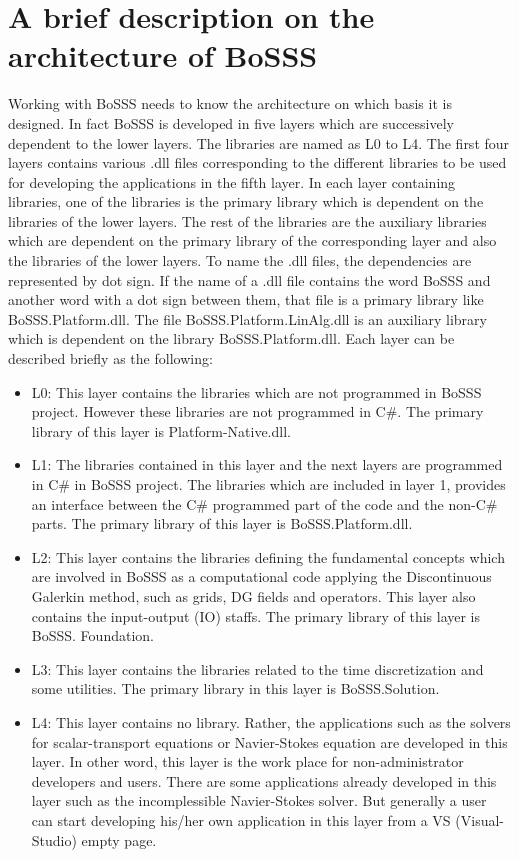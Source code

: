 \documentclass[11pt,twoside,a4paper]{fdyartcl}
\begin{document}
\section{A brief description on the architecture of BoSSS}
Working with BoSSS needs to know the architecture on which basis it is designed. In fact BoSSS is developed in five layers which are successively dependent to the lower layers. The libraries are named as L0 to L4. The first four layers contains various {\scriptsize .dll} files corresponding to the different libraries to be used for developing the applications in the fifth layer. In each layer containing libraries, one of the libraries is the primary library which is dependent on the libraries of the lower layers. The rest of the libraries are the auxiliary libraries which are dependent on the primary library of the corresponding layer and also the libraries of the lower layers. To name the {\scriptsize .dll} files, the dependencies are represented by {\scriptsize dot} sign. If the name of a {\scriptsize .dll} file contains the word {\scriptsize BoSSS} and another word with a {\scriptsize dot} sign between them, that file is a primary library like {\scriptsize BoSSS.Platform.dll}. The file {\scriptsize BoSSS.Platform.LinAlg.dll} is an auxiliary library which is dependent on the library {\scriptsize BoSSS.Platform.dll}. Each layer can be described briefly as the following:
\begin{itemize}
\item L0: This layer contains the libraries which are not programmed in BoSSS project. However these libraries are not programmed in C\#. The primary library of this layer is {\scriptsize Platform-Native.dll}.
\item L1: The libraries contained in this layer and the next layers are programmed in C\# in BoSSS project. The libraries which are included in layer 1, provides an interface between the C\# programmed part of the code and the non-C\# parts. The primary library of this layer is {\scriptsize BoSSS.Platform.dll}.
\item L2: This layer contains the libraries defining the fundamental concepts which are involved in BoSSS as a computational code applying the Discontinuous Galerkin method, such as grids, DG fields and operators. This layer also contains the input-output (IO) staffs. The primary library of this layer is {\scriptsize BoSSS. Foundation}.
\item L3: This layer contains the libraries related to the time discretization and some utilities. The primary library in this layer is {\scriptsize BoSSS.Solution}.
\item L4: This layer contains no library. Rather, the applications such as the solvers for scalar-transport equations or Navier-Stokes equation are developed in this layer. In other word, this layer is the work place for non-administrator developers and users. There are some applications already developed in this layer such as the incomplessible Navier-Stokes solver. But generally a user can start developing his/her own application in this layer from a VS (Visual-Studio) empty page.
\end{itemize}
\end{document}
